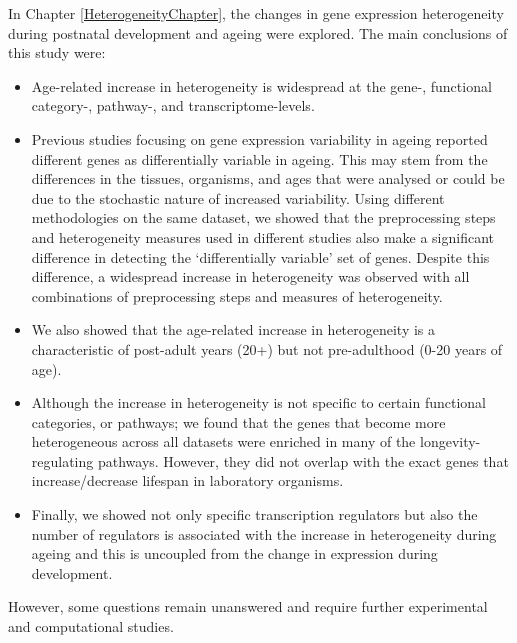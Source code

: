 \documentclass[12pt,twoside]{unicam}
\providecommand{\tightlist}{%
  \setlength{\itemsep}{0pt}\setlength{\parskip}{0pt}}
\begin{document}
In Chapter \ref{HeterogeneityChapter}, the changes in gene expression heterogeneity during postnatal development and ageing were explored. The main conclusions of this study were:

\begin{itemize}
\tightlist
\item
  Age-related increase in heterogeneity is widespread at the gene-, functional category-, pathway-, and transcriptome-levels.
\item
  Previous studies focusing on gene expression variability in ageing reported different genes as differentially variable in ageing. This may stem from the differences in the tissues, organisms, and ages that were analysed or could be due to the stochastic nature of increased variability. Using different methodologies on the same dataset, we showed that the preprocessing steps and heterogeneity measures used in different studies also make a significant difference in detecting the `differentially variable' set of genes. Despite this difference, a widespread increase in heterogeneity was observed with all combinations of preprocessing steps and measures of heterogeneity.
\item
  We also showed that the age-related increase in heterogeneity is a characteristic of post-adult years (20+) but not pre-adulthood (0-20 years of age).
\item
  Although the increase in heterogeneity is not specific to certain functional categories, or pathways; we found that the genes that become more heterogeneous across all datasets were enriched in many of the longevity-regulating pathways. However, they did not overlap with the exact genes that increase/decrease lifespan in laboratory organisms.
\item
  Finally, we showed not only specific transcription regulators but also the number of regulators is associated with the increase in heterogeneity during ageing and this is uncoupled from the change in expression during development.
\end{itemize}

However, some questions remain unanswered and require further experimental and computational studies.
\end{document}
